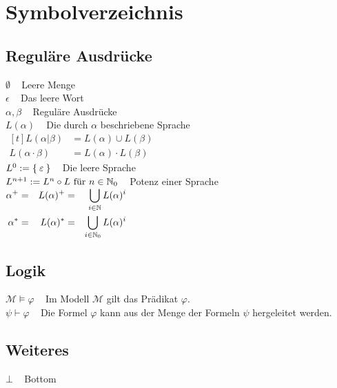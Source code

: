 \chapter*{Symbolverzeichnis}
\section*{Reguläre Ausdrücke}
$\emptyset\;\;\;$ Leere Menge\\
$\epsilon\;\;\;$ Das leere Wort\\
$\alpha, \beta\;\;\;$ Reguläre Ausdrücke\\
$L(\alpha)\;\;\;$ Die durch $\alpha$ beschriebene Sprache\\
$\begin{aligned}[t]
    L(\alpha | \beta)    &= L(\alpha) \cup L(\beta)\\
    L(\alpha \cdot \beta)&= L(\alpha) \cdot L(\beta)
\end{aligned}$\\
$L^0 := \Set{\varepsilon}\;\;\;$ Die leere Sprache\\
$L^{n+1} := L^n \circ L \text{ für } n \in \mathbb{N}_0\;\;\;$ Potenz einer Sprache\\
$\begin{aligned}[t]
    \alpha^+ &=& L(\alpha)^+ &=& \bigcup_{i \in \mathbb{N}} L(\alpha)^i\\
    \alpha^* &=& L(\alpha)^* &=& \bigcup_{i \in \mathbb{N}_0} L(\alpha)^i
\end{aligned}$

\section*{Logik}
$\mathcal{M} \models \varphi\;\;\;$ Im Modell $\mathcal{M}$ gilt das Prädikat $\varphi$.\\
$\psi \vdash \varphi\;\;\;$ Die Formel $\varphi$ kann aus der Menge der Formeln $\psi$ hergeleitet werden.\\
\section*{Weiteres}
$\bot\;\;\;$ Bottom\\